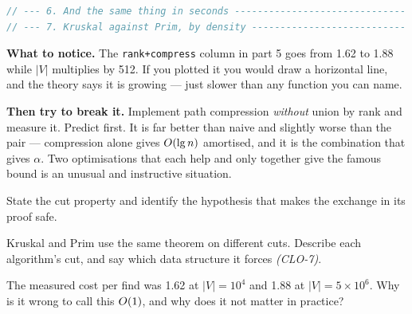 \begin{lab}
\begin{lstlisting}[language=C++]
// --- 6. And the same thing in seconds ------------------------------
// --- 7. Kruskal against Prim, by density ---------------------------
\end{lstlisting}

\textbf{What to notice.} The \texttt{rank+compress} column in part 5 goes from
1.62 to 1.88 while $|V|$ multiplies by 512. If you plotted it you would draw a
horizontal line, and the theory says it is growing --- just slower than any
function you can name.

\smallskip
\textbf{Then try to break it.} Implement path compression \emph{without} union
by rank and measure it. Predict first. It is far better than naive and slightly
worse than the pair --- compression alone gives $O(\operatorname{lg} n)$ amortised, and
it is the combination that gives $\alpha$. Two optimisations that each help and
only together give the famous bound is an unusual and instructive situation.
\end{lab}

\begin{checkpoint}
\begin{tightnum}
  \item State the cut property and identify the hypothesis that makes the
        exchange in its proof safe.
  \item Kruskal and Prim use the same theorem on different cuts. Describe each
        algorithm's cut, and say which data structure it forces \emph{(CLO-7)}.
  \item The measured cost per find was 1.62 at $|V| = 10^{4}$ and 1.88 at
        $|V| = 5 \times 10^{6}$. Why is it wrong to call this $O(1)$, and
        why does it not matter in practice?
\end{tightnum}
\end{checkpoint}

